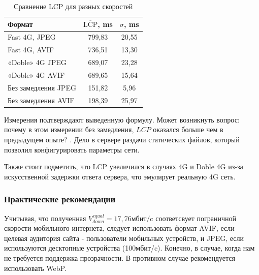 \documentclass[12pt]{article}
\begin{document}
\begin{table}[H]
    \centering
    \caption{Сравнение LCP для разных скоростей}
    \begin{tabular}{l S[table-format=3.2] S[table-format=2.2]}
        \toprule
        Формат              & {$\overline{\text{LCP}}$, \si{\milli\second}} & {$\sigma$, \si{\milli\second}} \\
        \midrule
        Fast 4G, JPEG       & 799,83                                        & 20,55                          \\
        Fast 4G, AVIF       & 736,51                                        & 13,30                          \\
        «Doble» 4G JPEG     & 689,07                                        & 23,28                          \\
        «Doble» 4G AVIF     & 689,65                                        & 15,64                          \\
        Без замедления JPEG & 151,82                                        & 5,96                           \\
        Без замедления AVIF & 198,39                                        & 25,97                          \\
        \bottomrule
    \end{tabular}
\end{table}

Измерения подтверждают выведенную формулу. Может возникнуть вопрос: почему в этом измерении без замедления, $LCP$ оказался больше чем в предыдущем опыте? .
Дело в сервере раздачи статических файлов, который позволил конфигурировать параметры сети.

Также стоит подметить, что LCP увеличился в случаях 4G и Doble 4G из-за искусственной задержки ответа сервера,
что эмулирует реальную 4G сеть.

\subsubsection{Практические рекомендации }

Учитывая, что полученная $V^{equal}_{down} = 17,76 \text{мбит/c}$ соответсвует пограничной скорости мобильного интернета, следует использовать формат AVIF, если целевая аудитория сайта - пользователи мобильных устройств, и JPEG, если используются десктопные устройства (100мбит/c). Конечно, в случае, когда нам не требуется поддержка прозрачности. В противном случае рекомендуется использовать WebP.
\end{document}
